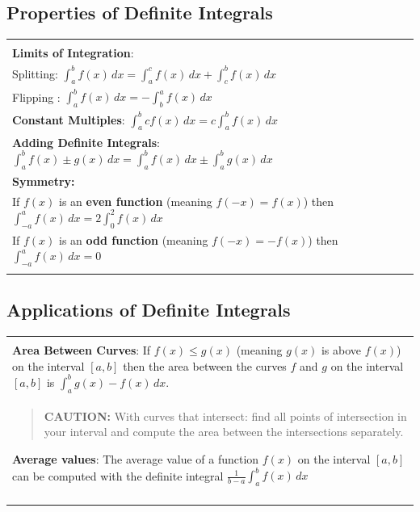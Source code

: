 \documentclass[12pt]{report}
\newenvironment{boxe}
    {\begin{center}
    \begin{tabular}{|p{0.9\textwidth}|}
    \hline\\
    }
    { 
    \\\\\hline
    \end{tabular} 
    \end{center}
    }
\begin{document}
\subsection*{Properties of Definite Integrals}
\begin{boxe}
\textbf{Limits of Integration}:\\ Splitting: $\displaystyle{\int_{a}^{b}f(x)\,dx=\int_{a}^{c}f(x)\,dx+\int_{c}^{b}f(x)\,dx}$\\
Flipping : $\displaystyle{\int_{a}^{b}f(x)\,dx=-\int_{b}^{a}f(x)\,dx}$\\
\textbf{Constant Multiples}: $\displaystyle{\int_{a}^{b}cf(x)\,dx=c\int_{a}^{b}f(x)\,dx}$\\
\textbf{Adding Definite Integrals}: $\displaystyle{\int_{a}^{b}f(x)\pm g(x)\,dx=\int_{a}^{b}f(x)\,dx\pm \int_{a}^{b}g(x)\,dx}$\\
\textbf{Symmetry:}\\ 
If $f(x)$ is an \textbf{even function} (meaning $f(-x)=f(x)$) then $\displaystyle{\int_{-a}^{a}f(x)\,dx=2\int_{0}^{2}f(x)\,dx}$\\
If $f(x)$ is an \textbf{odd function} (meaning $f(-x)=-f(x)$) then $\displaystyle{\int_{-a}^{a}f(x)\,dx=0}$
\end{boxe}
\subsection*{Applications of Definite Integrals}
\begin{boxe}
\textbf{Area Between Curves}: If $f(x)\leq g(x)$ (meaning $g(x)$ is above $f(x)$) on the interval $[a,b]$ then the area between the curves $f$ and $g$ on the interval $[a,b]$ is $\displaystyle{\int_{a}^{b}g(x)-f(x)\,dx}$.\\
\begin{quote}
\vspace{-.25in}
    \textbf{CAUTION:} With curves that intersect: find all points of intersection in your interval and compute the area between the intersections separately.
\end{quote}

\textbf{Average values}: The average value of a function $f(x)$ on the interval $[a,b]$ can be computed with the definite integral $\displaystyle{\frac{1}{b-a}\int_{a}^{b}f(x)\,dx}$
\end{boxe}
\end{document}
